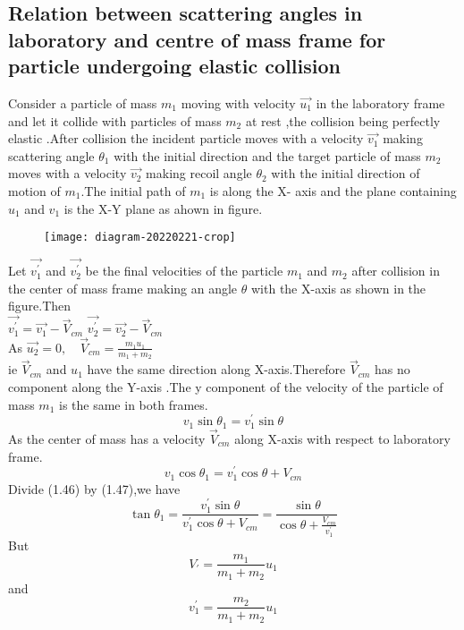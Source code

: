  \subsection{Relation between scattering angles in laboratory and centre of mass frame for particle undergoing elastic collision}
 Consider a particle of mass $m_1$ moving with velocity $\vec{u_1}$ in the laboratory frame and let it collide with particles of mass $m_2$ at rest ,the collision being perfectly elastic .After collision the incident particle moves with a velocity $\vec{v_1}$ making scattering angle $\theta_{1}$ with the initial direction and the target particle of mass $m_2$ moves with a velocity $\vec{v_2}$ making recoil angle $\theta_{2}$ with the initial direction of motion of $m_1$.The initial path of $m_1$ is along the X- axis and the plane containing $u_1$ and $v_1$ is the X-Y plane as ahown in figure.\\
 \begin{figure}[H]
 	\centering
 	\texttt{[image: diagram-20220221-crop]}
 	\caption{}
 	\label{}
 \end{figure}
 Let $\vec{v_1^{\prime}}$ and $\vec{v_2^{\prime}}$ be the final velocities of the particle $m_1$ and $m_2$ after collision in the center of mass frame making an angle $\theta$ with the X-axis as shown in the figure.Then\\
 $\vec{v_1^{\prime}}=\vec{v_1}-\vec{V}_{cm}$ \hspace{1cm} $\vec{v_2^{\prime}}=\vec{v_2}-\vec{V}_{cm}$\\
As $\vec{u_2}=0 ,\quad \vec{V}_{cm}=\frac{m_1u_1}{m_1+m_2}$\\
ie $\vec{V}_{cm}$ and $u_1$ have the same direction along X-axis.Therefore $\vec{V}_{cm}$ has no component along the Y-axis .The y component of the velocity of the particle of mass $m_1$ is the same in both frames.
\begin{equation}
v_1\sin\theta_1=v_1^{\prime}\sin\theta
\end{equation}
As the center of mass has a velocity $\vec{V}_{cm}$ along X-axis with respect to laboratory frame.
\begin{equation}
v_1\cos \theta_{1}=v_1^{\prime}\cos\theta +V_{cm}
\end{equation}
 Divide (1.46) by (1.47),we have \\
 $$\tan\theta_{1}=\frac{v_1^{\prime}\sin\theta}{v_1^{\prime}\cos\theta +V_{cm}}=\frac{\sin\theta}{\cos \theta +\frac{V_{cm}}{v_1^{\prime}}}$$
 But $$V_{\prime}=\frac{m_1}{m_1+m_2}u_1$$
 and $$v_1^{\prime}=\frac{m_2}{m_1+m_2}u_1$$
